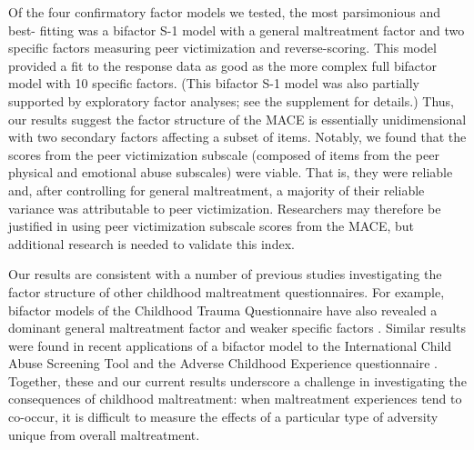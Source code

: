\documentclass[letterpaper,man,natbib,noextraspace,floatsintext,longtable,12pt]{apa6}
\begin{document}
Of the four confirmatory factor models we tested, the most parsimonious and best- fitting was a bifactor S-1 model with a general maltreatment factor and two specific factors measuring peer victimization and reverse-scoring. This model provided a fit to the response data as good as the more complex full bifactor model with 10 specific factors. (This bifactor S-1 model was also partially supported by exploratory factor analyses; see the supplement for details.) Thus, our results suggest the factor structure of the MACE is essentially unidimensional with two secondary factors affecting a subset of items. Notably, we found that the scores from the peer victimization subscale (composed of items from the peer physical and emotional abuse subscales) were viable. That is, they were reliable and, after controlling for general maltreatment, a majority of their reliable variance was attributable to peer victimization. Researchers may therefore be justified in using peer victimization subscale scores from the MACE, but additional research is needed to validate this index.

Our results are consistent with a number of previous studies investigating the factor structure of other childhood maltreatment questionnaires. For example, bifactor models of the Childhood Trauma Questionnaire have also revealed a dominant general maltreatment factor and weaker specific factors \citep{spinhoven2014childhood, stagaki2022mediating}. Similar results were found in recent applications of a bifactor model to the International Child Abuse Screening Tool \citep{meinck2021factor} and the Adverse Childhood Experience questionnaire \citep{dobson2021latent}. Together, these and our current results underscore a challenge in investigating the consequences of childhood maltreatment: when maltreatment experiences tend to co-occur, it is difficult to measure the effects of a particular type of adversity unique from overall maltreatment.  
 
\end{document}
